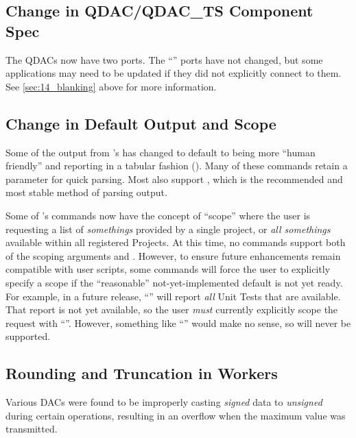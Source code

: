 \subsection{Change in QDAC/QDAC\_TS Component Spec}
The QDACs now have two ports. The ``'' ports have not changed, but some applications may need to be updated if they did not explicitly connect to them. See \ref{sec:14_blanking} above for more information.

\subsection{Change in \ocpidev Default Output and Scope}
\label{sec:14_ocpidev_changes}
Some of the output from 's  has changed to default to being more ``human friendly'' and reporting in a tabular fashion (). Many of these commands retain a  parameter for quick parsing. Most also support , which is the recommended and most stable method of parsing \ocpidev output.\newline

Some of 's  commands now have the concept of ``scope'' where the user is requesting a list of \textit{somethings} provided by a single project, or \textit{all somethings} available within all registered Projects. At this time, no commands support both of the scoping arguments  and . However, to ensure future \ocpidev enhancements remain compatible with user scripts, some commands will force the user to explicitly specify a scope if the ``reasonable'' not-yet-implemented default is not yet ready. For example, in a future release, ``'' will report \textit{all} Unit Tests that are available. That report is not yet available, so the user \textit{must} currently explicitly scope the request with ``''. However, something like ``'' would make no sense, so will never be supported.

\subsection{Rounding and Truncation in  Workers} %
\label{sec:14_rounding}
Various DACs were found to be improperly casting \textit{signed} data to \textit{unsigned} during certain operations, resulting in an overflow when the maximum value was transmitted.

